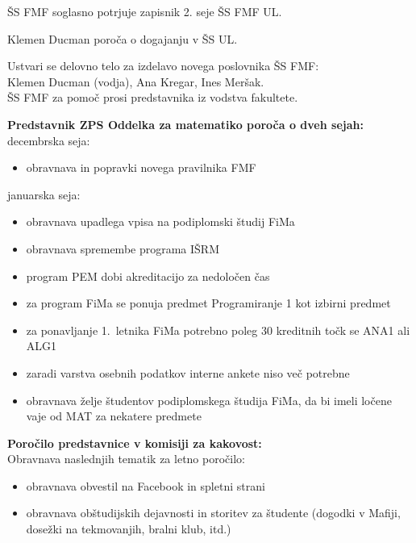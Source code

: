 \documentclass{seja}
\begin{document}
\begin{ad}
	
	\item
	ŠS FMF soglasno potrjuje zapisnik 2. seje ŠS FMF UL.
	
	\item 
	Klemen Ducman poroča o dogajanju v ŠS UL.
	
	\item
	Ustvari se delovno telo za izdelavo novega poslovnika ŠS FMF: \\
	Klemen Ducman (vodja),  Ana Kregar, Ines Meršak. \\
	ŠS FMF za pomoč prosi predstavnika iz vodstva fakultete.
	
	\item
	\textbf{Predstavnik ZPS Oddelka za matematiko poroča o dveh sejah:}\\
	decembrska seja:
		\begin{itemize}
			\item 
			obravnava in popravki novega pravilnika FMF
		\end{itemize}
	januarska seja:
		\begin{itemize}
			\item 
			obravnava upadlega vpisa na podiplomski študij FiMa
			\item 
			obravnava spremembe programa IŠRM
			\item
			program PEM dobi akreditacijo za nedoločen čas
			\item
			za program FiMa se ponuja predmet Programiranje 1 kot izbirni predmet
			\item
			za ponavljanje 1.~letnika FiMa potrebno poleg 30 kreditnih točk se ANA1 ali ALG1
			\item 
			zaradi varstva osebnih podatkov interne ankete niso več potrebne
			\item 
			obravnava želje študentov podiplomskega študija FiMa, da bi imeli ločene vaje od MAT za nekatere predmete						
		\end{itemize}
	
	\textbf{Poročilo predstavnice v komisiji za kakovost:}\\
	Obravnava naslednjih tematik za letno poročilo:
		\begin{itemize}
			\item 
			obravnava obvestil na Facebook in spletni strani
			\item 
			obravnava obštudijskih dejavnosti in storitev za študente (dogodki v Mafiji, dosežki na tekmovanjih, bralni klub, itd.)
		\end{itemize}
	

\end{ad}
\end{document}
